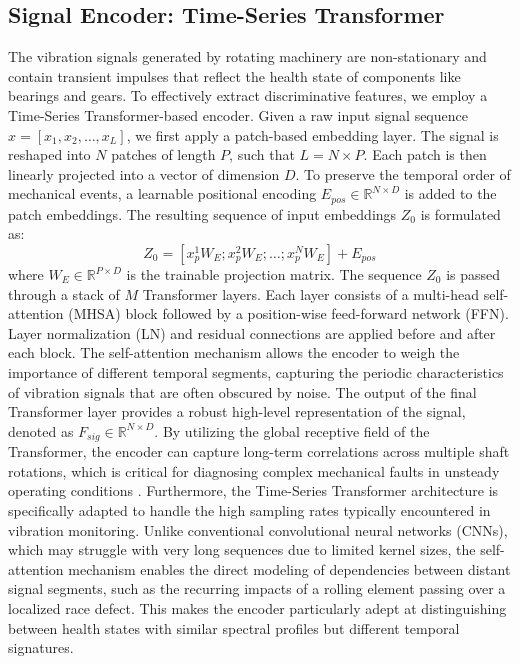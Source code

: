 \subsection{Signal Encoder: Time-Series Transformer}
The vibration signals generated by rotating machinery are non-stationary and contain transient impulses that reflect the health state of components like bearings and gears. To effectively extract discriminative features, we employ a Time-Series Transformer-based encoder. Given a raw input signal sequence $x = [x_1, x_2, \dots, x_L]$, we first apply a patch-based embedding layer. The signal is reshaped into $N$ patches of length $P$, such that $L = N \times P$. Each patch is then linearly projected into a vector of dimension $D$. To preserve the temporal order of mechanical events, a learnable positional encoding $E_{pos} \in \mathbb{R}^{N \times D}$ is added to the patch embeddings. The resulting sequence of input embeddings $Z_0$ is formulated as:
\begin{equation}
Z_0 = [x_p^1 W_E; x_p^2 W_E; \dots; x_p^N W_E] + E_{pos}
\end{equation}
where $W_E \in \mathbb{R}^{P \times D}$ is the trainable projection matrix. The sequence $Z_0$ is passed through a stack of $M$ Transformer layers. Each layer consists of a multi-head self-attention (MHSA) block followed by a position-wise feed-forward network (FFN). Layer normalization (LN) and residual connections are applied before and after each block. The self-attention mechanism allows the encoder to weigh the importance of different temporal segments, capturing the periodic characteristics of vibration signals that are often obscured by noise. The output of the final Transformer layer provides a robust high-level representation of the signal, denoted as $F_{sig} \in \mathbb{R}^{N \times D}$. By utilizing the global receptive field of the Transformer, the encoder can capture long-term correlations across multiple shaft rotations, which is critical for diagnosing complex mechanical faults in unsteady operating conditions \cite{vaswani2017attention, li2023transformer}. Furthermore, the Time-Series Transformer architecture is specifically adapted to handle the high sampling rates typically encountered in vibration monitoring. Unlike conventional convolutional neural networks (CNNs), which may struggle with very long sequences due to limited kernel sizes, the self-attention mechanism enables the direct modeling of dependencies between distant signal segments, such as the recurring impacts of a rolling element passing over a localized race defect. This makes the encoder particularly adept at distinguishing between health states with similar spectral profiles but different temporal signatures.

